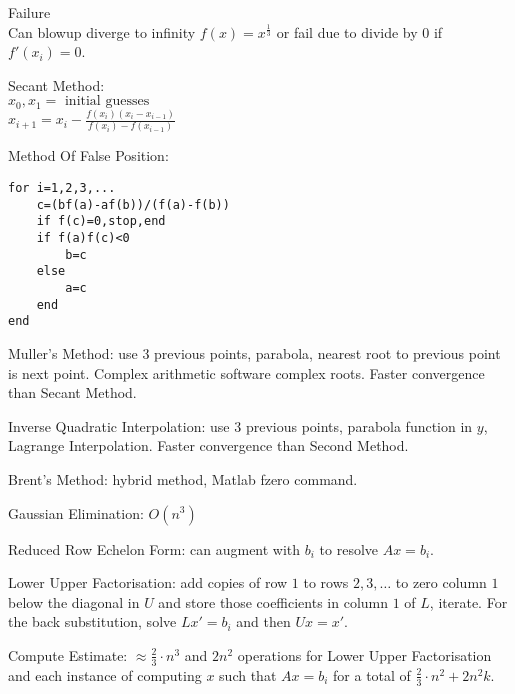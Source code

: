 Failure \\
Can blowup diverge to infinity $f(x)=x^{\frac{1}{3}}$ or fail due to divide by $0$ if $f'(x_i) = 0$.

Secant Method: \\
$x_0,x_1 = \text{ initial guesses}$ \\
$x_{i+1} = x_i - \frac{f(x_i)(x_i-x_{i-1})}{f(x_i)-f(x_{i-1})}$

Method Of False Position:
\begin{verbatim}
for i=1,2,3,...
    c=(bf(a)-af(b))/(f(a)-f(b))
    if f(c)=0,stop,end
    if f(a)f(c)<0
        b=c
    else
        a=c
    end
end
\end{verbatim}

Muller's Method: use $3$ previous points, parabola, nearest root to previous point is next point. Complex arithmetic software complex roots. Faster convergence than Secant Method.

Inverse Quadratic Interpolation: use $3$ previous points, parabola function in $y$, Lagrange Interpolation. Faster convergence than Second Method.

Brent's Method: hybrid method, Matlab fzero command.

Gaussian Elimination: $O(n^3)$

Reduced Row Echelon Form: can augment with $b_i$ to resolve $Ax = b_i$.

Lower Upper Factorisation: add copies of row $1$ to rows $2,3,\dots$ to zero column $1$ below the diagonal in $U$ and store those coefficients in column $1$ of $L$, iterate. For the back substitution, solve $L x' = b_i$ and then $U x = x'$.

Compute Estimate: $\approx \frac{2}{3} \cdot n^3$ and $2n^2$ operations for Lower Upper Factorisation and each instance of computing $x$ such that $Ax = b_i$ for a total of $\frac{2}{3} \cdot n^2 + 2 n^2 k$.